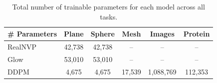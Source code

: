 \begin{table}[H]
\centering
\small
\setlength{\tabcolsep}{4pt}
\renewcommand{\arraystretch}{1.15}
\begin{tabular}{lccccc}
\toprule
\textbf{\# Parameters} & \textbf{Plane} & \textbf{Sphere} & \textbf{Mesh} & \textbf{Images} & \textbf{Protein} \\
\midrule
RealNVP & 42{,}738 & 42{,}738 & -- & -- & -- \\
Glow & 53{,}010 & 53{,}010 & -- & -- & -- \\
DDPM & 4{,}675 & 4{,}675 & 17{,}539 & 1{,}088{,}769 & 112{,}353 \\
\bottomrule
\end{tabular}
\caption{Total number of trainable parameters for each model across all tasks.}
\end{table}
